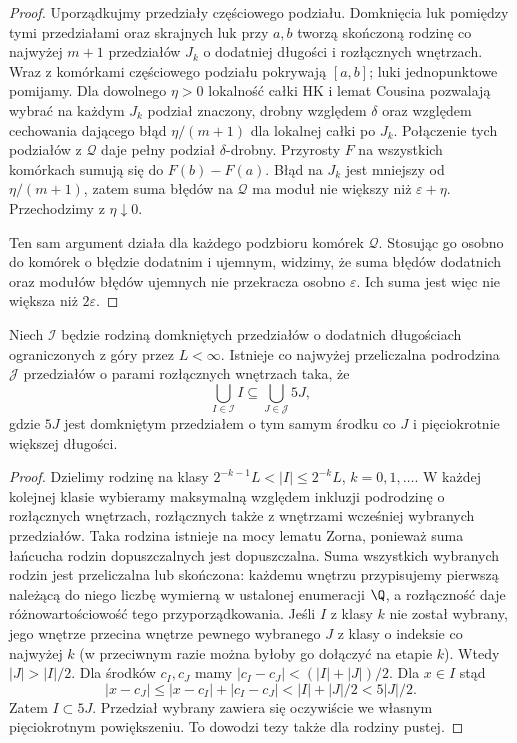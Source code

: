 \begin{proof}
Uporządkujmy przedziały częściowego podziału. Domknięcia luk pomiędzy tymi przedziałami oraz skrajnych luk przy $a,b$ tworzą skończoną rodzinę co najwyżej $m+1$ przedziałów $J_k$ o dodatniej długości i rozłącznych wnętrzach. Wraz z komórkami częściowego podziału pokrywają $[a,b]$; luki jednopunktowe pomijamy. Dla dowolnego $\eta>0$ lokalność całki HK i lemat Cousina pozwalają wybrać na każdym $J_k$ podział znaczony, drobny względem $\delta$ oraz względem cechowania dającego błąd $\eta/(m+1)$ dla lokalnej całki po $J_k$. Połączenie tych podziałów z $\mathcal Q$ daje pełny podział $\delta$-drobny. Przyrosty $F$ na wszystkich komórkach sumują się do $F(b)-F(a)$. Błąd na $J_k$ jest mniejszy od $\eta/(m+1)$, zatem suma błędów na $\mathcal Q$ ma moduł nie większy niż $\varepsilon+\eta$. Przechodzimy z $\eta\downarrow0$.

Ten sam argument działa dla każdego podzbioru komórek $\mathcal Q$. Stosując go osobno do komórek o błędzie dodatnim i ujemnym, widzimy, że suma błędów dodatnich oraz modułów błędów ujemnych nie przekracza osobno $\varepsilon$. Ich suma jest więc nie większa niż $2\varepsilon$.
\end{proof}
\begin{lemat}\label{ma1:kh:lem:fivefold-cover}
Niech $\mathcal I$ będzie rodziną domkniętych przedziałów o dodatnich długościach ograniczonych z góry przez $L<\infty$. Istnieje co najwyżej przeliczalna podrodzina $\mathcal J$ przedziałów o parami rozłącznych wnętrzach taka, że
\[
 \bigcup_{I\in\mathcal I} I\subseteq\bigcup_{J\in\mathcal J}5J,
\]
gdzie $5J$ jest domkniętym przedziałem o tym samym środku co $J$ i pięciokrotnie większej długości.
\end{lemat}
\begin{proof}
Dzielimy rodzinę na klasy $2^{-k-1}L<|I|\le 2^{-k}L$, $k=0,1,\ldots$. W każdej kolejnej klasie wybieramy maksymalną względem inkluzji podrodzinę o rozłącznych wnętrzach, rozłącznych także z wnętrzami wcześniej wybranych przedziałów. Taka rodzina istnieje na mocy lematu Zorna, ponieważ suma łańcucha rodzin dopuszczalnych jest dopuszczalna. Suma wszystkich wybranych rodzin jest przeliczalna lub skończona: każdemu wnętrzu przypisujemy pierwszą należącą do niego liczbę wymierną w ustalonej enumeracji $\Q$, a rozłączność daje różnowartościowość tego przyporządkowania.
Jeśli $I$ z klasy $k$ nie został wybrany, jego wnętrze przecina wnętrze pewnego wybranego $J$ z klasy o indeksie co najwyżej $k$ (w przeciwnym razie można byłoby go dołączyć na etapie $k$). Wtedy $|J|>|I|/2$. Dla środków $c_I,c_J$ mamy $|c_I-c_J|<(|I|+|J|)/2$. Dla $x\in I$ stąd
\[
 |x-c_J|\le |x-c_I|+|c_I-c_J|<|I|+|J|/2<5|J|/2.
\]
Zatem $I\subset 5J$. Przedział wybrany zawiera się oczywiście we własnym pięciokrotnym powiększeniu. To dowodzi tezy także dla rodziny pustej.
\end{proof}

